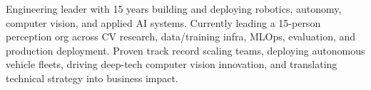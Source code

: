 

\begin{cvparagraph}

Engineering leader with 15 years building and deploying robotics, autonomy, computer vision, and applied AI systems. Currently leading a 15-person perception org across CV research, data/training infra, MLOps, evaluation, and production deployment. Proven track record scaling teams, deploying autonomous vehicle fleets, driving deep-tech computer vision innovation, and translating technical strategy into business impact.
\end{cvparagraph}
